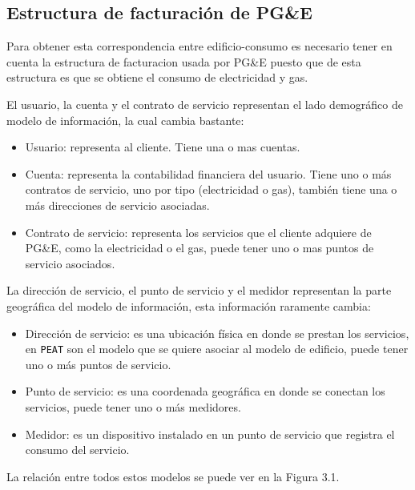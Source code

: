 \subsection{Estructura de facturación de PG\&E}
Para obtener esta correspondencia entre edificio-consumo es necesario
tener en cuenta la estructura de facturacion usada por PG\&E puesto
que de esta estructura es que se obtiene el consumo de electricidad y gas.

El usuario, la cuenta y el contrato de servicio representan el lado demográfico
de modelo de información, la cual cambia bastante:

\begin{itemize}
\item Usuario: representa al cliente. Tiene una o mas cuentas.
\item Cuenta: representa la contabilidad financiera del usuario. Tiene uno o más
  contratos de servicio, uno por tipo (electricidad o gas), también tiene una o más
  direcciones de servicio asociadas.
\item Contrato de servicio: representa los servicios que el cliente adquiere
  de PG\&E, como la electricidad o el gas, puede tener uno o mas puntos
  de servicio asociados.
\end{itemize}

La dirección de servicio, el punto de servicio y el medidor representan
la parte geográfica del modelo de información, esta información raramente cambia:

\begin{itemize}
\item Dirección de servicio: es una ubicación física en donde se prestan los
  servicios, en \texttt{PEAT} son el modelo que se quiere asociar al modelo
  de edificio, puede tener uno o más puntos de servicio.
\item Punto de servicio: es una coordenada geográfica en donde se conectan los
  servicios, puede tener uno o más medidores.
\item Medidor: es un dispositivo instalado en un punto de servicio que registra el
  consumo del servicio.
\end{itemize}

La relación entre todos estos modelos se puede ver en la Figura 3.1.


